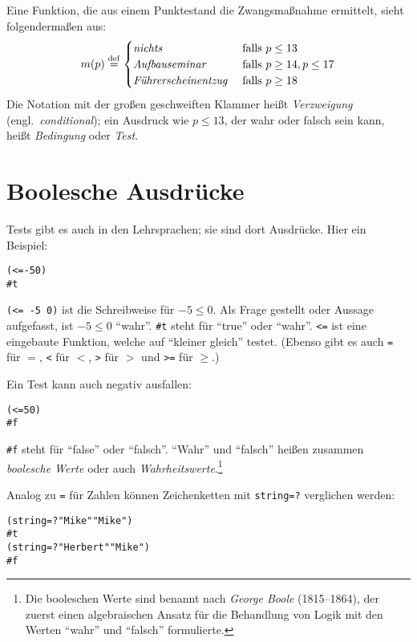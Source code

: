 Eine Funktion, die  aus einem Punktestand die Zwangsmaßnahme ermittelt,
sieht folgendermaßen aus:
%
\begin{displaymath}
  m(p) \stackrel{\rm def}{=}
  \begin{cases}
    \textit{nichts} & \textrm{falls $p \leq 13$}
    \\
    \textit{Aufbauseminar} & \textrm{falls $p \geq 14, p \leq 17$}
    \\
    \textit{Führerscheinentzug } & \textrm{falls $p \geq 18$}
  \end{cases}
\end{displaymath}
%
Die Notation mit der großen geschweiften Klammer heißt
\textit{Verzweigung} (engl.\
\textit{conditional}); ein Ausdruck wie $p\leq 13$,
der wahr oder falsch sein kann,
heißt \textit{Bedingung} oder
\textit{Test}.

\section{Boolesche Ausdrücke}

Tests gibt es auch in den Lehrsprachen; sie sind dort Ausdrücke.
Hier ein Beispiel:
%
\begin{alltt}
(<= -5 0)
\evalsto{} #t
\end{alltt}
%
\texttt{(<= -5 0)} ist die Schreibweise für $-5 \leq 0$.  Als Frage
gestellt oder Aussage aufgefasst, ist $-5 \leq 0$ "`wahr"'.
\verb|#t| steht für "`true"' oder
"`wahr\index{wahr}"'.  \texttt{<=}\index{<=@\texttt{<=}} ist eine
eingebaute Funktion, welche auf "`kleiner gleich"' testet.  (Ebenso
gibt es auch \texttt{=}\index{=@\texttt{=}} für $=$, 
\texttt{<} für $<$,
\texttt{>} für $>$ und
\texttt{>=} für $\geq$.)

Ein Test kann auch negativ ausfallen:
%
\begin{alltt}
(<= 5 0)
\evalsto{} #f
\end{alltt}
%
\verb|#f| steht für "`false"' oder "`falsch"'.
"`Wahr"' und "`falsch"' heißen zusammen \textit{boolesche
  Werte} oder auch
\textit{Wahrheitswerte}.\footnote{Die booleschen
  Werte sind benannt nach \textit{George Boole}
  (1815--1864), der zuerst einen algebraischen Ansatz für die
  Behandlung von Logik mit den Werten "`wahr"' und "`falsch"'
  formulierte.}

Analog zu \texttt{=} für Zahlen können Zeichenketten mit
\texttt{string=?} verglichen werden:
\begin{alltt}
(string=? "Mike" "Mike")
\evalsto{} #t
(string=? "Herbert" "Mike")
\evalsto{} #f
\end{alltt}

